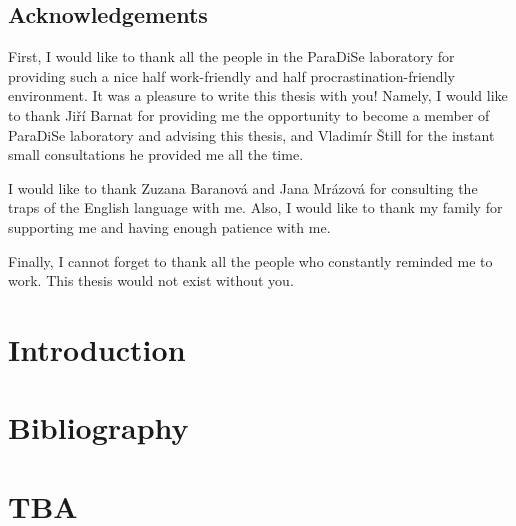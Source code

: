\documentclass[11pt,twoside,a4paper]{book}
\begin{document}
\section*{Acknowledgements}
First, I would like to thank all the people in the ParaDiSe laboratory for
providing such a nice half work-friendly and half procrastination-friendly
environment. It was a pleasure to write this thesis with you! Namely, I would
like to thank Jiří Barnat for providing me the opportunity to become a member of
ParaDiSe laboratory and advising this thesis, and Vladimír Štill for the instant
small consultations he provided me all the time.

I would like to thank Zuzana Baranová and Jana Mrázová for consulting the traps
of the English language with me. Also, I would like to thank my family for
supporting me and having enough patience with me.

Finally, I cannot forget to thank all the people who constantly reminded me to
work. This thesis would not exist without you.


\cleardoublepage
\thispagestyle{empty}

\pagestyle{headings}
\tableofcontents
\mainmatter

\chapter{Introduction}\label{chap:introduction}





\chapter*{Bibliography}
\markboth{}{} %
\printbibliography[heading=none]

\appendix
\chapter{TBA}
\end{document}
